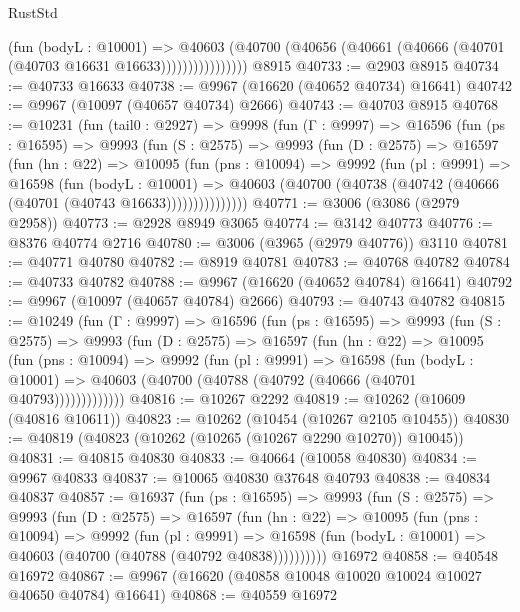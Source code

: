 \begin{lexlean}{RustStd}
\begin{coremodule}
                      (fun (bodyL : @10001) =>
                      @40603
                        (@40700
                          (@40656 (@40661 (@40666 (@40701 (@40703 @16631 @16633))))))))))))))))
    @8915
@40733 := @2903 @8915
@40734 := @40733 @16633
@40738 := @9967 (@16620 (@40652 @40734) @16641)
@40742 := @9967 (@10097 (@40657 @40734) @2666)
@40743 := @40703 @8915
@40768 := @10231
    (fun (tail0 : @2927) =>
    @9998
      (fun (Γ : @9997) =>
      @16596
        (fun (ps : @16595) =>
        @9993
          (fun (S : @2575) =>
          @9993
            (fun (D : @2575) =>
            @16597
              (fun (hn : @22) =>
              @10095
                (fun (pns : @10094) =>
                @9992
                  (fun (pl : @9991) =>
                  @16598
                    (fun (bodyL : @10001) =>
                    @40603 (@40700 (@40738 (@40742 (@40666 (@40701 (@40743 @16633)))))))))))))))
@40771 := @3006 (@3086 (@2979 @2958))
@40773 := @2928 @8949 @3065
@40774 := @3142 @40773
@40776 := @8376 @40774 @2716
@40780 := @3006 (@3965 (@2979 @40776)) @3110
@40781 := @40771 @40780
@40782 := @8919 @40781
@40783 := @40768 @40782
@40784 := @40733 @40782
@40788 := @9967 (@16620 (@40652 @40784) @16641)
@40792 := @9967 (@10097 (@40657 @40784) @2666)
@40793 := @40743 @40782
@40815 := @10249
    (fun (Γ : @9997) =>
    @16596
      (fun (ps : @16595) =>
      @9993
        (fun (S : @2575) =>
        @9993
          (fun (D : @2575) =>
          @16597
            (fun (hn : @22) =>
            @10095
              (fun (pns : @10094) =>
              @9992
                (fun (pl : @9991) =>
                @16598
                  (fun (bodyL : @10001) =>
                  @40603 (@40700 (@40788 (@40792 (@40666 (@40701 @40793)))))))))))))
@40816 := @10267 @2292
@40819 := @10262 (@10609 (@40816 @10611))
@40823 := @10262 (@10454 (@10267 @2105 @10455))
@40830 := @40819 (@40823 (@10262 (@10265 (@10267 @2290 @10270)) @10045))
@40831 := @40815 @40830
@40833 := @40664 (@10058 @40830)
@40834 := @9967 @40833
@40837 := @10065 @40830 @37648 @40793
@40838 := @40834 @40837
@40857 := @16937
    (fun (ps : @16595) =>
    @9993
      (fun (S : @2575) =>
      @9993
        (fun (D : @2575) =>
        @16597
          (fun (hn : @22) =>
          @10095
            (fun (pns : @10094) =>
            @9992
              (fun (pl : @9991) =>
              @16598 (fun (bodyL : @10001) => @40603 (@40700 (@40788 (@40792 @40838))))))))))
    @16972
@40858 := @40548 @16972
@40867 := @9967 (@16620 (@40858 @10048 @10020 @10024 @10027 @40650 @40784) @16641)
@40868 := @40559 @16972

\end{coremodule}
\end{lexlean}
